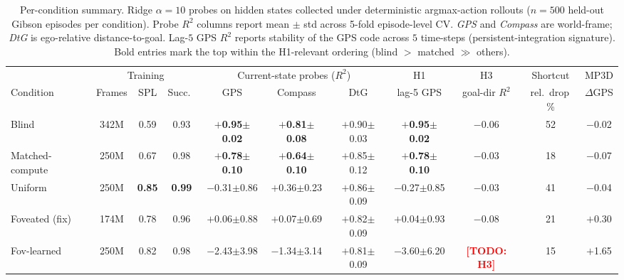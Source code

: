 \documentclass{article}
\newcommand{\TODO}[1]{\textcolor{red}{\textbf{[TODO: #1]}}}
\begin{document}
\begin{table}[t]
\centering
\small
\setlength{\tabcolsep}{3.5pt}
\caption{Per-condition summary. Ridge $\alpha=10$ probes on hidden states collected under deterministic argmax-action rollouts ($n{=}500$ held-out Gibson episodes per condition). Probe $R^2$ columns report mean $\pm$ std across 5-fold episode-level CV. \emph{GPS} and \emph{Compass} are world-frame; \emph{DtG} is ego-relative distance-to-goal. Lag-$5$ GPS $R^2$ reports stability of the GPS code across $5$ time-steps (persistent-integration signature). Bold entries mark the top within the H1-relevant ordering (blind $>$ matched $\gg$ others).}
\label{tab:summary}
\begin{tabular}{lccc@{\hspace{10pt}}ccc@{\hspace{8pt}}cc@{\hspace{8pt}}c@{\hspace{8pt}}c}
\toprule
 & \multicolumn{3}{c}{Training} & \multicolumn{3}{c}{Current-state probes ($R^2$)} & H1 & H3 & Shortcut & MP3D \\
 \cmidrule(lr){2-4} \cmidrule(lr){5-7} \cmidrule(lr){8-8} \cmidrule(lr){9-9} \cmidrule(lr){10-10} \cmidrule(lr){11-11}
Condition & Frames & SPL & Succ.\ & GPS & Compass & DtG & lag-5 GPS & goal-dir $R^2$ & rel.\ drop\,\% & $\Delta$GPS \\
\midrule
Blind                 & 342M  & 0.59  & 0.93  & \textbf{$+$0.95$\pm$0.02} & \textbf{$+$0.81$\pm$0.08} & $+$0.90$\pm$0.03 & \textbf{$+$0.95$\pm$0.02} & $-$0.06 & 52 & $-$0.02 \\
Matched-compute       & 250M  & 0.67  & 0.98  & \textbf{$+$0.78$\pm$0.10} & \textbf{$+$0.64$\pm$0.10} & $+$0.85$\pm$0.12 & \textbf{$+$0.78$\pm$0.10} & $-$0.03 & 18 & $-$0.07 \\
Uniform               & 250M  & \textbf{0.85} & \textbf{0.99} & $-$0.31$\pm$0.86 & $+$0.36$\pm$0.23 & $+$0.86$\pm$0.09 & $-$0.27$\pm$0.85 & $-$0.03 & 41 & $-$0.04 \\
Foveated (fix)        & 174M  & 0.78          & 0.96          & $+$0.06$\pm$0.88 & $+$0.07$\pm$0.69 & $+$0.82$\pm$0.09 & $+$0.04$\pm$0.93 & $-$0.08 & 21 & $+$0.30 \\
Fov-learned           & 250M  & 0.82  & 0.98  & $-$2.43$\pm$3.98 & $-$1.34$\pm$3.14 & $+$0.81$\pm$0.09 & $-$3.60$\pm$6.20 & \TODO{H3} & 15 & $+$1.65 \\
\bottomrule
\end{tabular}
\end{table}
\end{document}
